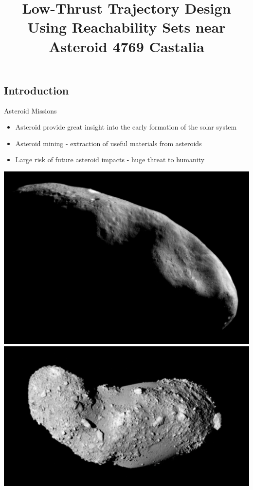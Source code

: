 \documentclass[11pt,professionalfonts]{beamer}
\title[Reachability Sets on \Poincare section]{\large\bf  Low-Thrust Trajectory Design Using Reachability Sets near Asteroid 4769 Castalia}
\author{\vspace*{-0.3cm}}
\institute{
	\footnotesize
	{\normalsize\bf{Shankar Kulumani and Taeyoung Lee}}\\
	\vspace*{0.2cm}
  	\textbf{Flight Dynamics \& Control Lab}\\ \vspace*{0.5cm}
 	\begin{figure} %
       	\texttt{[image: gw\_txh\_2cs\_pos]}
  	\end{figure}
}
\date{}
\begin{document}

\setcounter{framenumber}{-1}
\begin{frame} %
  \titlepage
\end{frame}   %

\section*{}
\subsection*{Introduction}  

\begin{frame}{Asteroid Missions}
\begin{itemize}
    \item Asteroid provide great insight into the early formation of the solar system
    \item Asteroid mining - extraction of useful materials from asteroids
    \item Large risk of future asteroid impacts - huge threat to humanity
\end{itemize}    

\begin{center}
    \includegraphics[height=0.3\textheight]{figures/near_mos_20001203_full.jpg}
    \hfill
    \includegraphics[height=0.3\textheight]{figures/Itokawa8_hayabusa_1210.jpg}
\end{center}


\end{frame}
\end{document}
